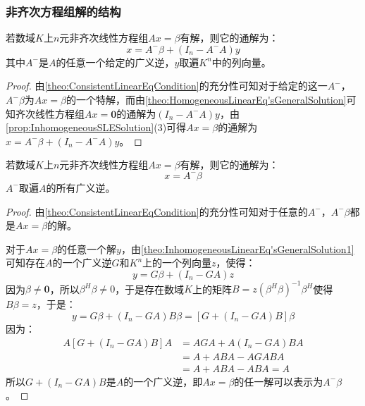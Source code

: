 \subsubsection{非齐次方程组解的结构}
\begin{theorem}[结构1]
	\label{theo:InhomogeneousLinearEq'sGeneralSolution1}
	若数域$K$上$n$元非齐次线性方程组$Ax=\beta$有解，则它的通解为：
	\begin{equation*}
		x=A^-\beta+(I_n-A^-A)y
	\end{equation*}
	其中$A^-$是$A$的任意一个给定的广义逆，$y$取遍$K^n$中的列向量。
\end{theorem}
\begin{proof}
	由\cref{theo:ConsistentLinearEqCondition}的充分性可知对于给定的这一$A^-$，$A^-\beta$为$Ax=\beta$的一个特解，而由\cref{theo:HomogeneousLinearEq'sGeneralSolution}可知齐次线性方程组$Ax=\mathbf{0}$的通解为$(I_n-A^-A)y$，由\cref{prop:InhomogeneousSLESolution}(3)可得$Ax=\beta$的通解为$x=A^-\beta+(I_n-A^-A)y$。
\end{proof}
\begin{theorem}[结构2]
	\label{theo:InhomogeneousLinearEq'sGeneralSolution2}
	若数域$K$上$n$元非齐次线性方程组$Ax=\beta$有解，则它的通解为：
	\begin{equation*}
		x=A^-\beta
	\end{equation*}
	$A^-$取遍$A$的所有广义逆。
\end{theorem}
\begin{proof}
	由\cref{theo:ConsistentLinearEqCondition}的充分性可知对于任意的$A^-$，$A^-\beta$都是$Ax=\beta$的解。\par
	对于$Ax=\beta$的任意一个解$y$，由\cref{theo:InhomogeneousLinearEq'sGeneralSolution1}可知存在$A$的一个广义逆$G$和$K^n$上的一个列向量$z$，使得：
	\begin{equation*}
		y=G\beta+(I_n-GA)z
	\end{equation*}
	因为$\beta\ne\mathbf{0}$，所以$\beta^H\beta\ne0$，于是存在数域$K$上的矩阵$B=z(\beta^H\beta)^{-1}\beta^H$使得$B\beta=z$，于是：
	\begin{equation*}
		y=G\beta+(I_n-GA)B\beta=[G+(I_n-GA)B]\beta
	\end{equation*}
	因为：
	\begin{align*}
		A[G+(I_n-GA)B]A
		&=AGA+A(I_n-GA)BA \\
		&=A+ABA-AGABA \\
		&=A+ABA-ABA=A
	\end{align*}
	所以$G+(I_n-GA)B$是$A$的一个广义逆，即$Ax=\beta$的任一解可以表示为$A^-\beta$。
\end{proof}

